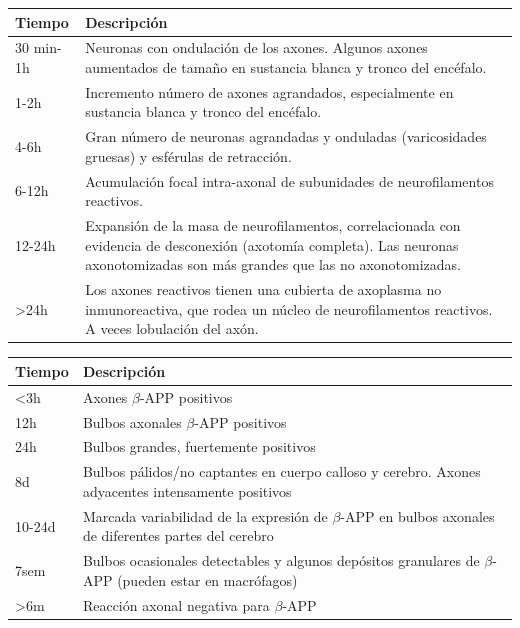 \begin{table}[]
	\begin{tabular}{lp{100mm}}
		\toprule
		Tiempo & Descripción \\ \hline
		30 min-1h & Neuronas con ondulación de los axones. Algunos axones aumentados de tamaño en sustancia blanca y tronco del encéfalo. \\
		1-2h & Incremento número de axones agrandados, especialmente en sustancia blanca y tronco del encéfalo. \\
		4-6h & Gran número de neuronas agrandadas y onduladas (varicosidades gruesas) y esférulas de retracción. \\
		6-12h & Acumulación focal intra-axonal de subunidades de neurofilamentos reactivos. \\
		12-24h & Expansión de la masa de neurofilamentos, correlacionada con evidencia de desconexión (axotomía completa). Las neuronas axonotomizadas son más grandes que las no axonotomizadas. \\
		\textgreater{}24h & Los axones reactivos tienen una cubierta de axoplasma no inmunoreactiva, que rodea un núcleo de neurofilamentos reactivos. A veces lobulación del axón. \\ \bottomrule
	\end{tabular}
\end{table}

\begin{table}[]
	\begin{tabular}{@{}lp{100mm}@{}}
		\toprule
		Tiempo & Descripción \\ \midrule
		\textless{}3h & Axones $\beta$-APP positivos \\
		12h & Bulbos axonales $\beta$-APP positivos \\
		24h & Bulbos grandes, fuertemente positivos \\
		8d & Bulbos pálidos/no captantes en cuerpo calloso y cerebro. Axones adyacentes intensamente positivos \\
		10-24d & Marcada variabilidad de la expresión de $\beta$-APP en bulbos axonales de diferentes partes del cerebro \\
		7sem & Bulbos ocasionales detectables y algunos depósitos granulares de  $\beta$-APP (pueden estar en macrófagos) \\
		\textgreater{}6m & Reacción axonal negativa para  $\beta$-APP \\ \bottomrule
	\end{tabular}
\end{table}

